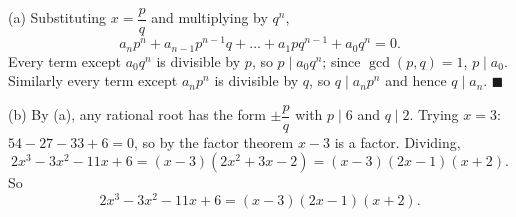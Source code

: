 (a) Substituting $x=\dfrac {p}{q}$ and multiplying by $q^n$,
\[
a_np^n+a_{n-1}p^{n-1}q+\dots+a_1pq^{n-1}+a_0q^n=0.
\]
Every term except $a_0q^n$ is divisible by $p$, so $p\mid a_0q^n$; since $\gcd(p,q)=1$, $p\mid a_0$. Similarly every term except $a_np^n$ is divisible by $q$, so $q\mid a_np^n$ and hence $q\mid a_n$. $\blacksquare$

(b) By (a), any rational root has the form $\pm\dfrac {p}{q}$ with $p\mid6$ and $q\mid2$. Trying $x=3$: $54-27-33+6=0$, so by the factor theorem $x-3$ is a factor. Dividing,
\[
2x^3-3x^2-11x+6=(x-3)(2x^2+3x-2)=(x-3)(2x-1)(x+2).
\]
So
\[\boxed{2x^3-3x^2-11x+6=(x-3)(2x-1)(x+2)}.\]
